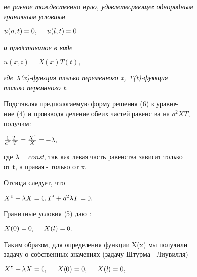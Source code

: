 \documentclass[12pt]{article}
\begin{document}
\textit{не равное тождественно нулю, удовлетворяющее однородным \\ граничным условиям}

\begin{center}
$u(o,t)=0,\hspace{0.5cm}u(l,t)=0$
\end{center}

\textit{и представимое в виде}

\begin{center}
$u(x,t)=X(x)T(t),$
\end{center}

\textit{где X(x)-функция только переменного x, T(t)-функция \\ только перемнного t.}

\hspace{0.5cm}
\textnormal{Подставляя предпологаемую форму решения (6) в уравне-\\ние (4) и производя деление обеих частей равенства на $a^2XT$,\\получим:}

\begin{center}
$\frac{1}{a^2}\frac{T^`}{T}=\frac{X^"}{X}=-\lambda,$
\end{center}

\textnormal{где $\lambda= const$, так как левая часть равенства зависит только \\от t, а правая - только от x.}

\hspace{0.5cm}
\textnormal{Отсюда следует, что}

\begin{center}
$X"+\lambda X= 0,\\T'+a^2\lambda T = 0.$
\end{center}

\textnormal{Граничные условия (5) дают:}

\begin{center}
$X(0)=0,\hspace{0.5cm}X(l)=0.$
\end{center}

\newpage
{}
\rhead{[ГЛ III}
\renewcommand{\headrulewidth}{0pt}

\textnormal{Таким образом, для определения функции X(x) мы получили \\ задачу о собственных значениях (задачу Штурма - Лиувилля)}

\begin{center}
$X"+\lambda X=0,\hspace{0.5cm}X(0)=0,\hspace{0.5cm}X(l)=0,$
\end{center}
\end{document}
